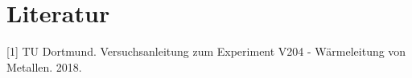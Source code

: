\section{Literatur}

[1] TU Dortmund. Versuchsanleitung zum Experiment V204 - Wärmeleitung von Metallen. 2018. 
